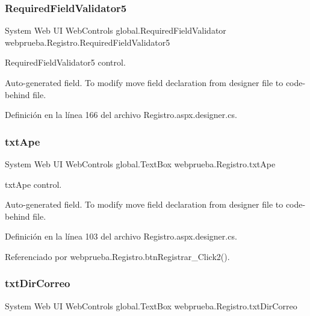 \subsubsection{\texorpdfstring{RequiredFieldValidator5}{RequiredFieldValidator5}}
{\footnotesize\ttfamily System Web UI Web\+Controls global.\+Required\+Field\+Validator webprueba.\+Registro.\+Required\+Field\+Validator5\hspace{0.3cm}{\ttfamily [protected]}}



Required\+Field\+Validator5 control. 

Auto-\/generated field. To modify move field declaration from designer file to code-\/behind file. 

Definición en la línea 166 del archivo Registro.\+aspx.\+designer.\+cs.

\mbox{\label{classwebprueba_1_1_registro_a557ea2b695ccccea3abad14161dbb1da}} 
\subsubsection{\texorpdfstring{txtApe}{txtApe}}
{\footnotesize\ttfamily System Web UI Web\+Controls global.\+Text\+Box webprueba.\+Registro.\+txt\+Ape\hspace{0.3cm}{\ttfamily [protected]}}



txt\+Ape control. 

Auto-\/generated field. To modify move field declaration from designer file to code-\/behind file. 

Definición en la línea 103 del archivo Registro.\+aspx.\+designer.\+cs.



Referenciado por webprueba.\+Registro.\+btn\+Registrar\+\_\+\+Click2().

\mbox{\label{classwebprueba_1_1_registro_aba5344a542583708e70c49fe3a5ded0b}} 
\subsubsection{\texorpdfstring{txtDirCorreo}{txtDirCorreo}}
{\footnotesize\ttfamily System Web UI Web\+Controls global.\+Text\+Box webprueba.\+Registro.\+txt\+Dir\+Correo\hspace{0.3cm}{\ttfamily [protected]}}



